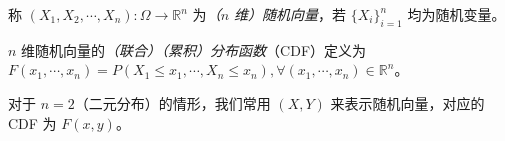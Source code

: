 \documentclass[../main.tex]{subfiles}
\begin{document}
\begin{definition}\label{def:3.1.1}
称 $(X_1,X_2,\cdots,X_n):\Omega\rightarrow\mathbb R^n$ 为\emph{（$n$ 维）随机向量}，若 $\{X_i\}_{i=1}^n$ 均为随机变量。
\end{definition}

\begin{definition}\label{def:3.1.2}
$n$ 维随机向量的\emph{（联合）（累积）分布函数}（CDF）定义为 $F(x_1,\cdots,x_n)=P(X_1\leq x_1,\cdots,X_n\leq x_n),\forall (x_1,\cdots,x_n)\in\mathbb R^n$。
\end{definition}

对于 $n=2$（二元分布）的情形，我们常用 $(X,Y)$ 来表示随机向量，对应的 CDF 为 $F(x,y)$。
\end{document}
